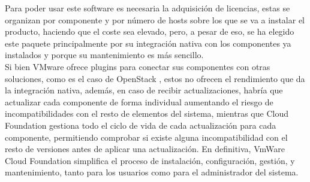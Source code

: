 Para poder usar este software es necesaria la adquisición de licencias, estas se organizan por componente y por número de hosts sobre los que se va a instalar el producto, haciendo que el coste sea elevado, pero, a pesar de eso, se ha elegido este paquete principalmente por su integración nativa con los componentes ya instalados y porque su mantenimiento es más sencillo. \\
Si bien VMware ofrece plugins para conectar sus componentes con otras soluciones, como es el caso de OpenStack \cite{opestackintegrated}, estos no ofrecen el rendimiento que da la integración nativa, además, en caso de recibir actualizaciones, habría que actualizar cada componente de forma individual aumentando el riesgo de incompatibilidades con el resto de elementos del sistema, mientras que Cloud Foundation gestiona todo el ciclo de vida de cada actualización para cada componente, permitiendo comprobar si existe alguna incompatibilidad con el resto de versiones antes de aplicar una actualización. En definitiva, VmWare Cloud Foundation simplifica el proceso de instalación, configuración, gestión, y mantenimiento, tanto para los usuarios como para el administrador del sistema.

